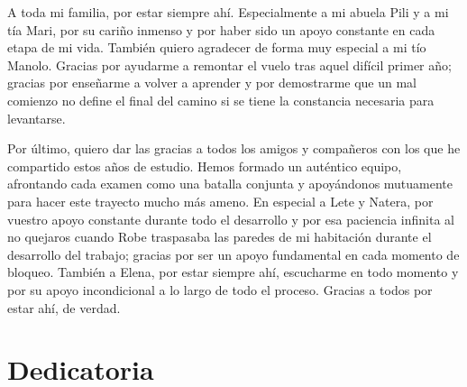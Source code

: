 \documentclass[hidelinks, headlogo, framedcover]{tfeEPCC}
\begin{document}
\vspace{0.4cm} %

\noindent A toda mi familia, por estar siempre ahí. Especialmente a mi abuela Pili y a mi tía Mari, por su cariño inmenso y por haber sido un apoyo constante en cada etapa de mi vida. También quiero agradecer de forma muy especial a mi tío Manolo. Gracias por ayudarme a remontar el vuelo tras aquel difícil primer año; gracias por enseñarme a volver a aprender y por demostrarme que un mal comienzo no define el final del camino si se tiene la constancia necesaria para levantarse.

\vspace{0.4cm}

\noindent Por último, quiero dar las gracias a todos los amigos y compañeros con los que he compartido estos años de estudio. Hemos formado un auténtico equipo, afrontando cada examen como una batalla conjunta y apoyándonos mutuamente para hacer este trayecto mucho más ameno. En especial a Lete y Natera, por vuestro apoyo constante durante todo el desarrollo y por esa paciencia infinita al no quejaros cuando Robe traspasaba las paredes de mi habitación durante el desarrollo del trabajo; gracias por ser un apoyo fundamental en cada momento de bloqueo. También a Elena, por estar siempre ahí, escucharme en todo momento y por su apoyo incondicional a lo largo de todo el proceso. Gracias a todos por estar ahí, de verdad.

\chapter*{Dedicatoria}
\thispagestyle{empty}
\end{document}
